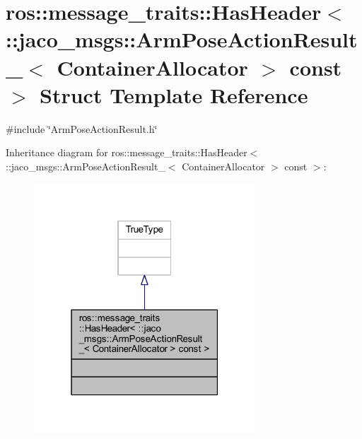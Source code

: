 \hypertarget{structros_1_1message__traits_1_1HasHeader_3_01_1_1jaco__msgs_1_1ArmPoseActionResult___3_01Contai85569afc72ddd18e1fef7fe6597a17f1}{}\section{ros\+:\+:message\+\_\+traits\+:\+:Has\+Header$<$ \+:\+:jaco\+\_\+msgs\+:\+:Arm\+Pose\+Action\+Result\+\_\+$<$ Container\+Allocator $>$ const $>$ Struct Template Reference}
\label{structros_1_1message__traits_1_1HasHeader_3_01_1_1jaco__msgs_1_1ArmPoseActionResult___3_01Contai85569afc72ddd18e1fef7fe6597a17f1}


{\ttfamily \#include \char`\"{}Arm\+Pose\+Action\+Result.\+h\char`\"{}}



Inheritance diagram for ros\+:\+:message\+\_\+traits\+:\+:Has\+Header$<$ \+:\+:jaco\+\_\+msgs\+:\+:Arm\+Pose\+Action\+Result\+\_\+$<$ Container\+Allocator $>$ const $>$\+:
\nopagebreak
\begin{figure}[H]
\begin{center}
\leavevmode
\includegraphics[width=235pt]{d7/da0/structros_1_1message__traits_1_1HasHeader_3_01_1_1jaco__msgs_1_1ArmPoseActionResult___3_01Contaif0b165457a3e94a309a395b94179c719}
\end{center}
\end{figure}


